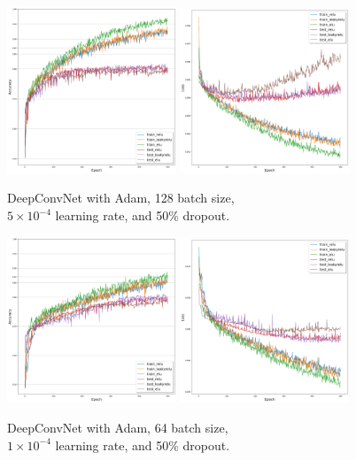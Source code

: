 	\begin{figure}[H]
		\centering
		\includegraphics[width=0.45\textwidth]{results/deepconvnet_adam_128_0.0005_0.5_acc.png}
		\includegraphics[width=0.45\textwidth]{results/deepconvnet_adam_128_0.0005_0.5_loss.png}
		\caption{DeepConvNet with Adam, 128 batch size, \\ $5 \times 10^{-4}$ learning rate, and 50\% dropout.}
	\end{figure}
	\begin{figure}[H]
		\centering
		\includegraphics[width=0.45\textwidth]{results/deepconvnet_adam_64_0.0001_0.5_acc.png}
		\includegraphics[width=0.45\textwidth]{results/deepconvnet_adam_64_0.0001_0.5_loss.png}
		\caption{DeepConvNet with Adam, 64 batch size, \\ $1 \times 10^{-4}$ learning rate, and 50\% dropout.}
	\end{figure}
